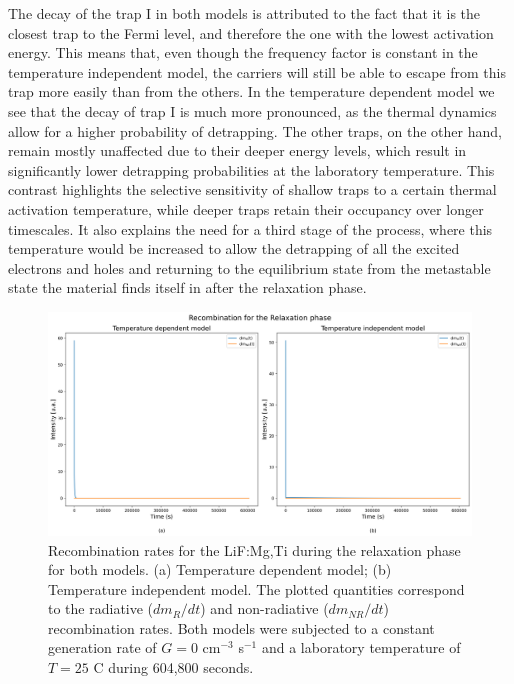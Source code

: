 The decay of the trap I in both models is attributed to the fact that it is the closest trap to the Fermi level, and therefore the one with the lowest activation energy. This means that, even though the frequency factor is constant in the temperature independent model, the carriers will still be able to escape from this trap more easily than from the others. In the temperature dependent model we see that the decay of trap I is much more pronounced, as the thermal dynamics allow for a higher probability of detrapping. The other traps, on the other hand, remain mostly unaffected due to their deeper energy levels, which result in significantly lower detrapping probabilities at the laboratory temperature. This contrast highlights the selective sensitivity of shallow traps to a certain thermal activation temperature, while deeper traps retain their occupancy over longer timescales. It also explains the need for a third stage of the process, where this temperature would be increased to allow the detrapping of all the excited electrons and holes and returning to the equilibrium state from the metastable state the material finds itself in after the relaxation phase.

\begin{figure}
    \centering
    \includegraphics[width=\textwidth]{Images/Relaxation Recombination.png}
    \caption[Radiative and non-radiative recombination rates during the relaxation phase for both models.]{Recombination rates for the LiF:Mg,Ti during the relaxation phase for both models. (a) Temperature dependent model; (b) Temperature independent model. The plotted quantities correspond to the radiative ($dm_R/dt$) and non-radiative ($dm_{NR}/dt$) recombination rates. Both models were subjected to a constant generation rate of $G = 0$ cm$^{-3}$ s$^{-1}$ and a laboratory temperature of $T = 25$ \textdegree C during 604,800 seconds.}
    \label{fig:relaxation_recombination}
\end{figure}

